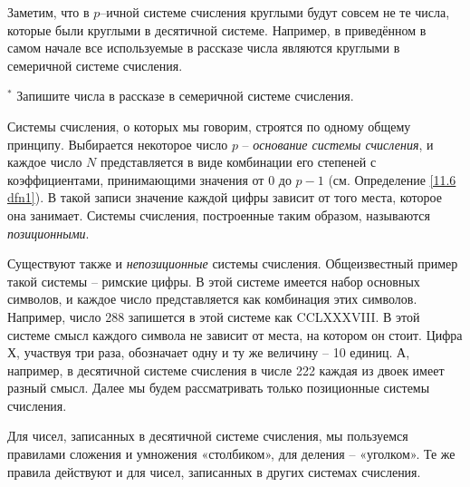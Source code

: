 \noindent Заметим, что в $p$--ичной системе счисления круглыми будут совсем не те числа, которые были круглыми в десятичной системе. Например, в приведённом в самом начале все используемые в рассказе числа являются круглыми в семеричной системе счисления.

\begin{ex} $^*$
    Запишите числа в рассказе в семеричной системе счисления.
\end{ex} 

\noindent Системы счисления, о которых мы говорим, строятся по одному общему принципу. Выбирается некоторое число $p$ -- \textit{основание системы счисления}, и каждое число $N$ представляется в виде комбинации его степеней с коэффициентами, принимающими значения от 0 до $p - 1$ (см. Определение \ref{11.6 dfn1}). В такой записи значение каждой цифры зависит от того места, которое она занимает. Системы счисления, построенные таким образом, называются \textit{позиционными}.

Существуют также и \textit{непозиционные} системы счисления. Общеизвестный пример такой системы -- римские цифры. В этой системе имеется набор основных символов, и каждое число представляется как комбинация этих символов. Например, число 288 запишется в этой системе как CCLXXXVIII. В этой системе смысл каждого символа не зависит от места, на котором он стоит. Цифра Х, участвуя три раза, обозначает одну и ту же величину -- 10 единиц. А, например, в десятичной системе счисления в числе 222 каждая из двоек имеет разный смысл. Далее мы будем рассматривать только позиционные системы счисления.

Для чисел, записанных в десятичной системе счисления, мы пользуемся правилами сложения и умножения «столбиком», для деления -- «уголком». Те же правила действуют и для чисел, записанных в других системах счисления.

